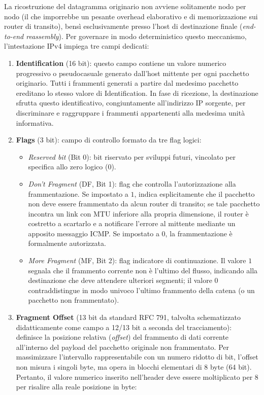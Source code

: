 \documentclass[11pt, a4paper]{article}
\begin{document}

La ricostruzione del datagramma originario non avviene solitamente nodo per nodo (il che imporrebbe un pesante overhead elaborativo e di memorizzazione sui router di transito), bensì esclusivamente presso l'host di destinazione finale (\emph{end-to-end reassembly}). Per governare in modo deterministico questo meccanismo, l'intestazione IPv4 impiega tre campi dedicati:
\begin{enumerate}
    \item \textbf{Identification} (16 bit): questo campo contiene un valore numerico progressivo o pseudocasuale generato dall'host mittente per ogni pacchetto originario. Tutti i frammenti generati a partire dal medesimo pacchetto ereditano lo stesso valore di Identification. In fase di ricezione, la destinazione sfrutta questo identificativo, congiuntamente all'indirizzo IP sorgente, per discriminare e raggruppare i frammenti appartenenti alla medesima unità informativa.
    \item \textbf{Flags} (3 bit): campo di controllo formato da tre flag logici:
    \begin{itemize}
        \item \emph{Reserved bit} (Bit 0): bit riservato per sviluppi futuri, vincolato per specifica allo zero logico ($0$).
        \item \emph{Don't Fragment} (DF, Bit 1): flag che controlla l'autorizzazione alla frammentazione. Se impostato a $1$, indica esplicitamente che il pacchetto non deve essere frammentato da alcun router di transito; se tale pacchetto incontra un link con MTU inferiore alla propria dimensione, il router è costretto a scartarlo e a notificare l'errore al mittente mediante un apposito messaggio ICMP. Se impostato a $0$, la frammentazione è formalmente autorizzata.
        \item \emph{More Fragment} (MF, Bit 2): flag indicatore di continuazione. Il valore $1$ segnala che il frammento corrente non è l'ultimo del flusso, indicando alla destinazione che deve attendere ulteriori segmenti; il valore $0$ contraddistingue in modo univoco l'ultimo frammento della catena (o un pacchetto non frammentato).
    \end{itemize}
    \item \textbf{Fragment Offset} (13 bit da standard RFC 791, talvolta schematizzato didatticamente come campo a 12/13 bit a seconda del tracciamento): definisce la posizione relativa (\emph{offset}) del frammento di dati corrente all'interno del payload del pacchetto originale non frammentato. Per massimizzare l'intervallo rappresentabile con un numero ridotto di bit, l'offset non misura i singoli byte, ma opera in blocchi elementari di 8 byte (64 bit). Pertanto, il valore numerico inserito nell'header deve essere moltiplicato per 8 per risalire alla reale posizione in byte:

\end{enumerate}
\end{document}
